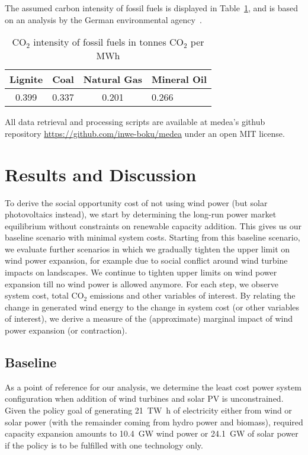 \documentclass[review, 3p, times]{elsarticle} %
\newcommand{\COO}{\ensuremath{\mathrm{CO_2}} }
\begin{document}
    The assumed carbon intensity of fossil fuels is displayed in Table~\ref{table:carbon-intensity}, and is based on an
    analysis by the German environmental agency~\citep{Juhrich2016}.

    \begin{table}[h!t]
        \centering
        \caption{\COO intensity of fossil fuels in tonnes \COO per MWh}
        \label{table:carbon-intensity}
        \begin{tabular}{c c c l}
            \toprule
            Lignite & Coal & Natural Gas & Mineral Oil   \\
            \midrule
            0.399 & 0.337 & 0.201 & 0.266         \\
            \bottomrule
        \end{tabular}
    \end{table}

    All data retrieval and processing scripts are available at medea's github repository
    \url{https://github.com/inwe-boku/medea} under an open MIT license.


    \section{Results and Discussion} \label{sec:results-discussion}
    To derive the social opportunity cost of not using wind power (but solar photovoltaics instead), we start by
    determining the long-run power market equilibrium without constraints on renewable capacity addition.
    This gives us our baseline scenario with minimal system costs.
    Starting from this baseline scenario, we evaluate further scenarios in which we gradually tighten the upper limit
    on wind power expansion, for example due to social conflict around wind turbine impacts on landscapes.
    We continue to tighten upper limits on wind power expansion till no wind power is allowed anymore.
    For each step, we observe system cost, total \COO emissions and other variables of interest.
    By relating the change in generated wind energy to the change in system cost (or other variables of interest), we
    derive a measure of the (approximate) marginal impact of wind power expansion (or contraction).

    \subsection{Baseline} \label{subsec:baseline}
    As a point of reference for our analysis, we determine the least cost power system configuration when addition of
    wind turbines and solar PV is unconstrained.
    Given the policy goal of generating \SI{21}{\tera\watt\hour} of electricity either from wind or solar power (with
    the remainder coming from hydro power and biomass), required capacity expansion amounts to \SI{10.4}{\giga\watt}
    wind power or \SI{24.1}{\giga\watt} of solar power if the policy is to be fulfilled with one technology only.
\end{document}
